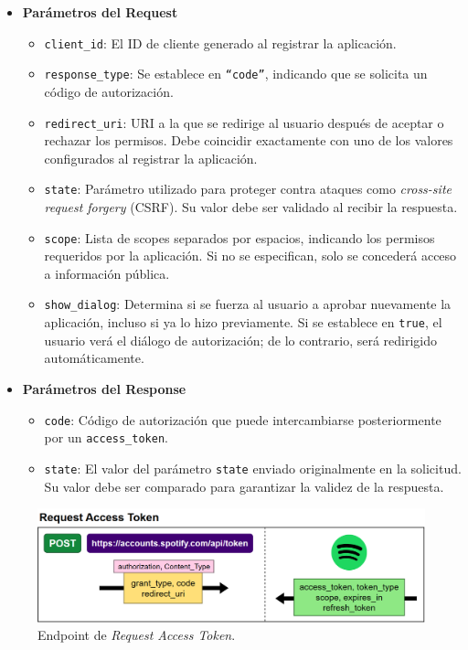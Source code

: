 \begin{itemize}
    \item \textbf{Parámetros del Request}
          \begin{itemize}
              \item \texttt{client\_id}: El ID de cliente generado al registrar la aplicación.
              \item \texttt{response\_type}: Se establece en \texttt{``code''}, indicando que se solicita un código de autorización.
              \item \texttt{redirect\_uri}: URI a la que se redirige al usuario después de aceptar o rechazar los permisos. Debe coincidir exactamente con uno de los valores configurados al registrar la aplicación.
              \item \texttt{state}: Parámetro utilizado para proteger contra ataques como \textit{cross-site request forgery} (CSRF). Su valor debe ser validado al recibir la respuesta.
              \item \texttt{scope}: Lista de scopes separados por espacios, indicando los permisos requeridos por la aplicación. Si no se especifican, solo se concederá acceso a información pública.
              \item \texttt{show\_dialog}: Determina si se fuerza al usuario a aprobar nuevamente la aplicación, incluso si ya lo hizo previamente. Si se establece en \texttt{true}, el usuario verá el diálogo de autorización; de lo contrario, será redirigido automáticamente.
          \end{itemize}
    \item \textbf{Parámetros del Response}
          \begin{itemize}
              \item \texttt{code}: Código de autorización que puede intercambiarse posteriormente por un \texttt{access\_token}.
              \item \texttt{state}: El valor del parámetro \texttt{state} enviado originalmente en la solicitud. Su valor debe ser comparado para garantizar la validez de la respuesta.
          \end{itemize}
\end{itemize}

\begin{figure}[H]
    \centering
    \includegraphics[width=\textwidth]{figures/endpoints/request_access_token.png}
    \caption{Endpoint de \textit{Request Access Token}.}
    \label{fig:req_access_token}
\end{figure}

